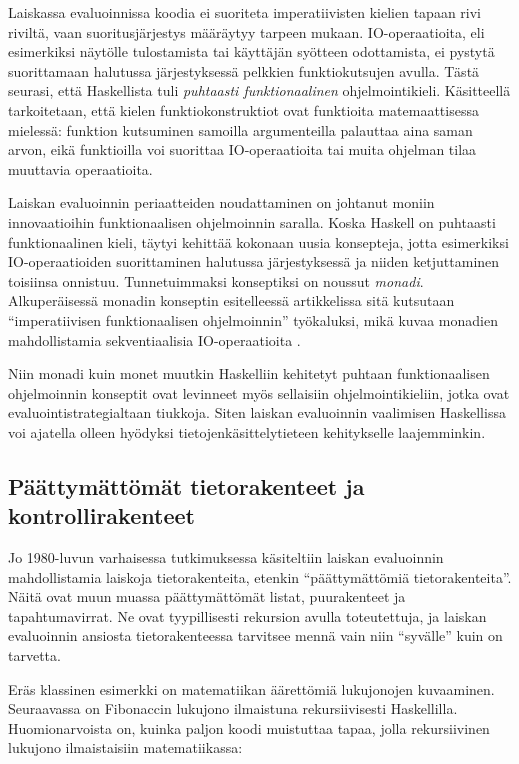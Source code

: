 Laiskassa evaluoinnissa koodia ei suoriteta imperatiivisten kielien tapaan rivi riviltä, vaan suoritusjärjestys määräytyy tarpeen mukaan. IO-operaatioita, eli esimerkiksi näytölle tulostamista tai käyttäjän syötteen odottamista, ei pystytä suorittamaan halutussa järjestyksessä pelkkien funktiokutsujen avulla. Tästä seurasi, että Haskellista tuli \textit{puhtaasti funktionaalinen} ohjelmointikieli. Käsitteellä tarkoitetaan, että kielen funktiokonstruktiot ovat funktioita matemaattisessa mielessä: funktion kutsuminen samoilla argumenteilla palauttaa aina saman arvon, eikä funktioilla voi suorittaa IO-operaatioita tai muita ohjelman tilaa muuttavia operaatioita.


Laiskan evaluoinnin periaatteiden noudattaminen on johtanut moniin innovaatioihin funktionaalisen ohjelmoinnin saralla. Koska Haskell on puhtaasti funktionaalinen kieli, täytyi kehittää kokonaan uusia konsepteja, jotta esimerkiksi IO-operaatioiden suorittaminen halutussa järjestyksessä ja niiden ketjuttaminen toisiinsa onnistuu. Tunnetuimmaksi konseptiksi on noussut \textit{monadi}. Alkuperäisessä monadin konseptin esitelleessä artikkelissa sitä kutsutaan ``imperatiivisen funktionaalisen ohjelmoinnin'' työkaluksi, mikä kuvaa monadien mahdollistamia sekventiaalisia IO-operaatioita \citep{PeytonJones199371}.

Niin monadi kuin monet muutkin Haskelliin kehitetyt puhtaan funktionaalisen ohjelmoinnin konseptit ovat levinneet myös sellaisiin ohjelmointikieliin, jotka ovat evaluointistrategialtaan tiukkoja. Siten laiskan evaluoinnin vaalimisen Haskellissa voi ajatella olleen hyödyksi tietojenkäsittelytieteen kehitykselle laajemminkin.

\subsection{Päättymättömät tietorakenteet ja kontrollirakenteet}

Jo 1980-luvun varhaisessa tutkimuksessa käsiteltiin laiskan evaluoinnin mahdollistamia laiskoja tietorakenteita, etenkin ``päättymättömiä tietorakenteita''. Näitä ovat muun muassa päättymättömät listat, puurakenteet ja tapahtumavirrat. Ne ovat tyypillisesti rekursion avulla toteutettuja, ja laiskan evaluoinnin ansiosta tietorakenteessa tarvitsee mennä vain niin ``syvälle'' kuin on tarvetta.

\newpage

Eräs klassinen esimerkki on matematiikan äärettömiä lukujonojen kuvaaminen. Seuraavassa on Fibonaccin lukujono ilmaistuna rekursiivisesti Haskellilla. Huomionarvoista on, kuinka paljon koodi muistuttaa tapaa, jolla rekursiivinen lukujono ilmaistaisiin matematiikassa:

